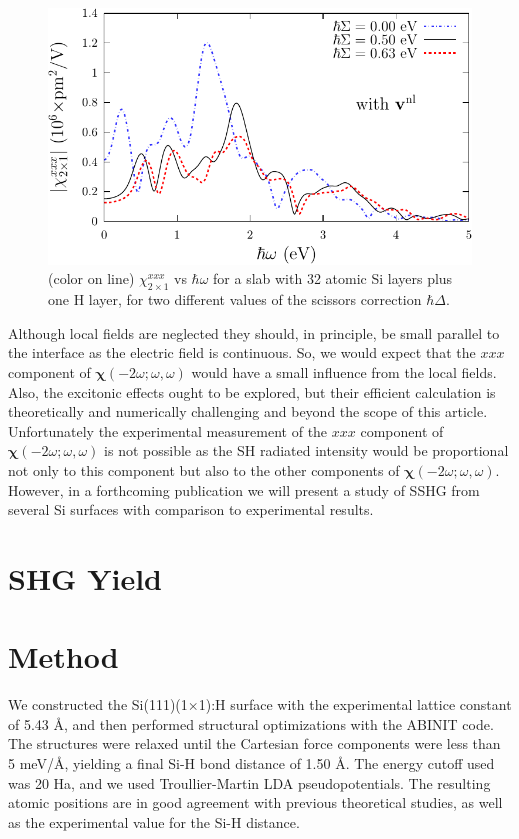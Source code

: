 \begin{figure}
\centering 
\includegraphics[scale=.8]{figures/03-results/chi2/fig6}
\caption{(color on line) 
$\chi^{xxx}_{2\times 1}$ vs $\hbar\omega$ for a slab with 32 atomic Si layers
plus one H layer, for two different values of the scissors correction
$\hbar\Delta$.
\label{fig4}} 
\end{figure}

Although local fields are neglected they should, in principle, be small parallel
to the interface as the electric field is continuous. So, we would expect that
the $xxx$ component of $\boldsymbol{\chi}(-2\omega;\omega,\omega)$ would have a
small influence from the local fields. Also, the excitonic effects ought to be
explored, but their efficient calculation is theoretically and numerically
challenging\cite{beyond}   and beyond the scope of this article. Unfortunately
the experimental measurement of the $xxx$ component of
$\boldsymbol{\chi}(-2\omega;\omega,\omega)$ is not possible as the SH radiated
intensity would be proportional not only to this component but also to the other
components of $\boldsymbol{\chi}(-2\omega;\omega,\omega)$. However, in a
forthcoming publication we will present a study of SSHG from several Si surfaces
with comparison to experimental results.


\section{SHG Yield}

\section{Method}\label{sec:method}

We constructed the Si(111)(1$\times$1):H surface with the experimental lattice
constant of 5.43 \AA, and then performed structural optimizations with the
ABINIT\cite{gonzeCPS09, abinit} code. The structures were relaxed until the
Cartesian force components were less than 5 meV/\AA, yielding a final Si-H bond
distance of 1.50 \AA. The energy cutoff used was 20 Ha, and we used
Troullier-Martin LDA pseudopotentials.\cite{troullierPRB91} The resulting atomic
positions are in good agreement with previous theoretical studies,
\cite{kaxirasPRB88, jonaPRB95, alfonsoPRB96, cargnoniJOCP00, mejiaPRB02} as well
as the experimental value for the Si-H distance.\cite{weastCRC88}

